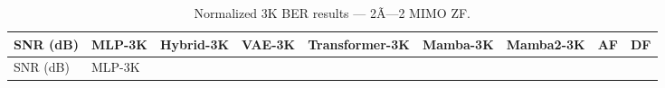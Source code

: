 \begin{longtable}[]{@{}
  >{\raggedright\arraybackslash}p{}
  >{\raggedright\arraybackslash}p{}
  >{\raggedright\arraybackslash}p{}
  >{\raggedright\arraybackslash}p{}
  >{\raggedright\arraybackslash}p{}
  >{\raggedright\arraybackslash}p{}
  >{\raggedright\arraybackslash}p{}
  >{\raggedright\arraybackslash}p{}
  >{\raggedright\arraybackslash}p{}@{}}
\caption{Normalized 3K BER results --- 2Ã—2 MIMO ZF.}\label{tbl:table10}\tabularnewline
\toprule\noalign{}
\begin{minipage}[b]{\linewidth}\raggedright
SNR (dB)
\end{minipage} & \begin{minipage}[b]{\linewidth}\raggedright
MLP-3K
\end{minipage} & \begin{minipage}[b]{\linewidth}\raggedright
Hybrid-3K
\end{minipage} & \begin{minipage}[b]{\linewidth}\raggedright
VAE-3K
\end{minipage} & \begin{minipage}[b]{\linewidth}\raggedright
Transformer-3K
\end{minipage} & \begin{minipage}[b]{\linewidth}\raggedright
Mamba-3K
\end{minipage} & \begin{minipage}[b]{\linewidth}\raggedright
Mamba2-3K
\end{minipage} & \begin{minipage}[b]{\linewidth}\raggedright
AF
\end{minipage} & \begin{minipage}[b]{\linewidth}\raggedright
DF
\end{minipage} \\
\midrule\noalign{}
\endfirsthead
\toprule\noalign{}
\begin{minipage}[b]{\linewidth}\raggedright
SNR (dB)
\end{minipage} & \begin{minipage}[b]{\linewidth}\raggedright
MLP-3K
\end{minipage} & \begin{minipage}[b]{\linewidth}\raggedright

\end{minipage}
\end{longtable}
